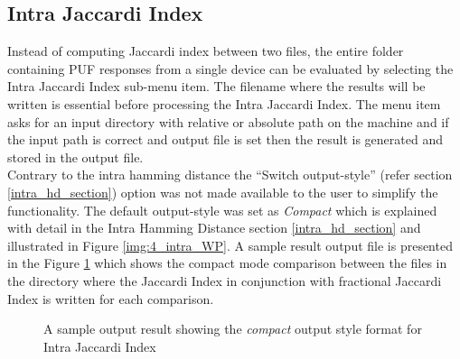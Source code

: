 \subsection{Intra Jaccardi Index}
Instead of computing Jaccardi index between two files, the entire folder containing PUF responses from a single device can be evaluated by selecting the Intra Jaccardi Index sub-menu item. The filename where the results will be written is essential before processing the Intra Jaccardi Index. The menu item asks for an input directory with relative or absolute path on the machine and if the input path is correct and output file is set then the result is generated and stored in the
output file.\\

Contrary to the intra hamming distance the ``Switch output-style'' (refer section \ref{intra_hd_section}) option was not made available to the user to simplify the functionality. The default output-style was set as \emph{Compact} which is explained with detail in the Intra Hamming Distance section \ref{intra_hd_section} and illustrated in Figure \ref{img:4_intra_WP}. A sample result output file is presented in the Figure \ref{img:intra_jaccardi_compact} which shows the compact mode comparison between the files in the
directory where the Jaccardi Index in conjunction with fractional Jaccardi Index is written for each comparison.\\

\begin{figure}[h]
\centering
{}
\caption{A sample output result showing the \emph{compact} output style format for Intra Jaccardi Index }
\label{img:intra_jaccardi_compact}
\end{figure}

